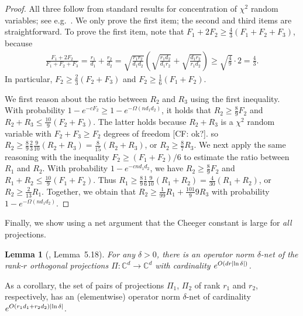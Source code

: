 \documentclass[aos]{imsart}
\newtheorem{lemma}[theorem]{Lemma}
\theoremstyle{definition}
\numberwithin{equation}{section}
\DeclarePairedDelimiter{\abs}{\lvert}{\rvert}
\newcommand{\C}{{\mathbb{C}}}
\newcommand{\CF}[1]{{\color{purple}[CF: #1]}}
\newcommand{\MW}[1]{{\color{red}[MW: #1]}}
\newcommand{\CF}[1]{{}}
\newcommand{\MW}[1]{{}}
\begin{document}
\begin{appendix}
\begin{proof}
All three follow from standard results for concentration of $\chi^2$ random variables; see e.g.~\cite{W19}.
We only prove the first item; the second and third items are straightforward.
To prove the first item, note that $F_1 + 2 F_2 \geq \frac43(F_1 + F_2 + F_3)$, because
\begin{align*}
  \frac{F_1 + 2 F_2}{F_1 + F_2 + F_3}
= \frac{r_1}{d_1} + \frac{r_2}{d_2}
= \sqrt{\frac{r_1r_2}{d_1d_2}} \left( \sqrt{\frac{r_1 d_2}{d_1 r_2}} + \sqrt{\frac{d_1 r_2}{r_1 d_2}} \right)
\geq \sqrt{\frac49} \cdot 2 = \frac43.
\end{align*}
In particular, $F_2 \geq \frac23(F_2 + F_3)$ and $F_2 \geq \frac16(F_1 + F_2)$. %

We first reason about the ratio between $R_2$ and $R_3$ using the first inequality.
With probability $1 - e^{- c F_2} \geq 1 - e^{- \Omega(n d_1 d_2)}$, it holds that $R_2 \geq \frac89 F_2$ and $R_2 + R_3 \leq \frac{10}9 (F _2 + F_3)$. The latter holds because $R_2 + R_3$ is a $\chi^2$ random variable with $F_2 + F_3 \geq F_2$ degrees of freedom \CF{ok?}. so $R_2 \geq \frac89 \frac23 \frac9{10} (R_2 + R_3) = \frac8{15} (R_2 + R_3)$, or $R_2 \geq \frac87 R_3$.
We next apply the same reasoning with the inequality $F_2 \geq (F_1 + F_2)/6$ to estimate the ratio between $R_1$ and $R_2$.
With probability $1 - e^{- c n d_1 d_2}$, we have $R_2 \geq \frac89 F_2$ and $R_1 + R_2 \leq \frac{10}9 (F_1 + F_2)$.
Thus $R_1 \geq \frac89 \frac16 \frac9{10} (R_1 + R_2) = \frac4{30} (R_1 + R_2)$, or $R_2 \geq \frac2{13} R_1$.
Together, we obtain that $R_2 \geq \frac1{99} R_1 + \frac{101}99 R_3$ with probability $1 - e^{-\Omega( n d_1 d_2)}$.
\end{proof}

Finally, we show using a net argument that the Cheeger constant is large for \emph{all} projections.

\begin{lemma}[\cite{FM20}, Lemma~5.18]\label{lem:net}
For any $\delta>0$, there is an operator norm $\delta$-net of the rank-$r$ orthogonal projections $\Pi\colon \C^d \to \C^d$ with cardinality $e^{O(d r \abs{\ln\delta})}$.
\end{lemma}

As a corollary, the set of pairs of projections $\Pi_1$, $\Pi_2$ of rank $r_1$ and $r_2$, respectively, has an (elementwise) operator norm $\delta$-net of cardinality $e^{O(r_1 d_1 + r_2 d_2) \abs{\ln \delta}}$.


\end{appendix}
\end{document}
